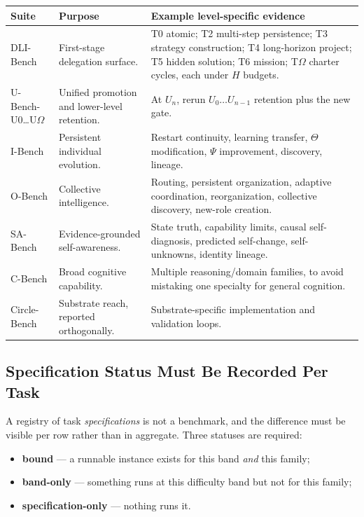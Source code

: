 \documentclass[11pt]{article}
\theoremstyle{definition}
\newcommand{\Om}{\ensuremath{\Omega}}
\begin{document}
\begin{table}[h]
\centering\small
\begin{tabularx}{\textwidth}{@{}lYY@{}}
\toprule
Suite & Purpose & Example level-specific evidence \\
\midrule
DLI-Bench & First-stage delegation surface. & T0 atomic; T2 multi-step persistence; T3 strategy construction; T4 long-horizon project; T5 hidden solution; T6 mission; T\Om{} charter cycles, each under $H$ budgets. \\
U-Bench-U0\ldots U\Om{} & Unified promotion and lower-level retention. & At $U_n$, rerun $U_0 \ldots U_{n-1}$ retention plus the new gate. \\
I-Bench & Persistent individual evolution. & Restart continuity, learning transfer, $\Theta$ modification, $\Psi$ improvement, discovery, lineage. \\
O-Bench & Collective intelligence. & Routing, persistent organization, adaptive coordination, reorganization, collective discovery, new-role creation. \\
SA-Bench & Evidence-grounded self-awareness. & State truth, capability limits, causal self-diagnosis, predicted self-change, self-unknowns, identity lineage. \\
C-Bench & Broad cognitive capability. & Multiple reasoning/domain families, to avoid mistaking one specialty for general cognition. \\
Circle-Bench & Substrate reach, reported orthogonally. & Substrate-specific implementation and validation loops. \\
\bottomrule
\end{tabularx}
\end{table}

\subsection{Specification Status Must Be Recorded Per Task}

A registry of task \emph{specifications} is not a benchmark, and the difference must be visible per row rather than in aggregate. Three statuses are required:

\begin{itemize}
\item \textbf{bound} --- a runnable instance exists for this band \emph{and} this family;
\item \textbf{band-only} --- something runs at this difficulty band but not for this family;
\item \textbf{specification-only} --- nothing runs it.
\end{itemize}
\end{document}
